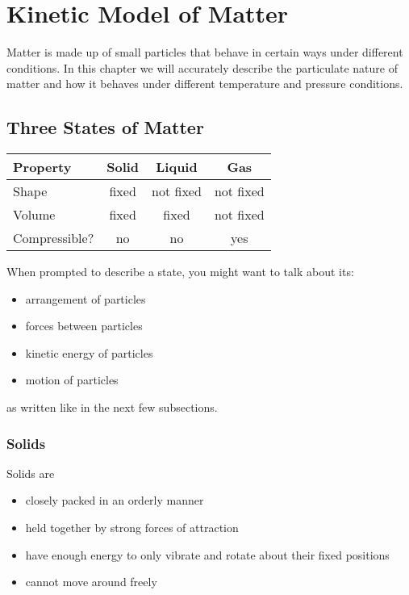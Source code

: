 \documentclass[../main.tex]{subfiles}
\begin{document}
	\section{Kinetic Model of Matter}
	
	\begin{preamb}
		Matter is made up of small particles that behave in certain ways under different conditions. In this chapter we will accurately describe the particulate nature of matter and how it behaves under different temperature and pressure conditions.
	\end{preamb}
	
	\subsection{Three States of Matter}
	\begin{center}
		\begin{tabularx}{0.85\linewidth}{Xccc}
			\hline \hline
			Property & Solid & Liquid & Gas \\ 
			\hline
			Shape & fixed & not fixed & not fixed \\ 
			Volume & fixed & fixed & not fixed \\ 
			Compressible? & no & no & yes \\ 
			\hline 
		\end{tabularx} 
	\end{center}
	
	When prompted to describe a state, you might want to talk about its:
	\begin{itemize}
		\item arrangement of particles
		\item forces between particles
		\item kinetic energy of particles
		\item motion of particles
	\end{itemize}
	as written like in the next few subsections.
	
	\subsubsection{Solids}
	Solids are
	\begin{itemize}
		\item closely packed in an orderly manner
		\item held together by strong forces of attraction
		\item have enough energy to only vibrate and rotate about their fixed positions
		\item cannot move around freely
	\end{itemize}
	
\end{document}
